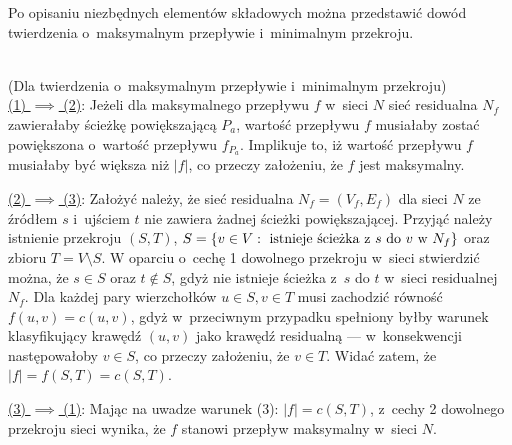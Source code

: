 \par{
  Po opisaniu niezbędnych elementów składowych można przedstawić dowód twierdzenia o~maksymalnym przepływie i~minimalnym przekroju.
\\
\\
  \begin{bproof}{(Dla twierdzenia o~maksymalnym przepływie i~minimalnym przekroju)\\}
    \underline{(1) $\implies$ (2)}: Jeżeli dla maksymalnego przepływu $f$ w~sieci $N$ sieć residualna $N_f$ zawierałaby ścieżkę powiększającą $P_a$, wartość przepływu $f$ musiałaby zostać powiększona o~wartość przepływu $f_{P_a}$.
    Implikuje to, iż wartość przepływu $f$ musiałaby być większa niż $|f|$, co przeczy założeniu, że $f$ jest maksymalny.

    \underline{(2) $\implies$ (3)}: Założyć należy, że sieć residualna $N_f=(V_f, E_f)$ dla sieci $N$ ze źródłem $s$ i~ujściem $t$ nie zawiera żadnej ścieżki powiększającej.
    Przyjąć należy istnienie przekroju $(S, T)$, $S=\{v \in V:\textnormal{ istnieje ścieżka z~}s\textnormal{ do }v\textnormal{ w~}N_f\}$ oraz zbioru $T=V\setminus S$.
    W oparciu o~cechę 1 dowolnego przekroju w~sieci stwierdzić można, że $s \in S$ oraz $t \notin S$, gdyż nie istnieje ścieżka z~$s$ do $t$ w~sieci residualnej $N_f$.
    Dla każdej pary wierzchołków $u \in S, v \in T$ musi zachodzić równość $f(u, v)=c(u, v)$, gdyż w~przeciwnym przypadku spełniony byłby warunek klasyfikujący krawędź $(u,v)$ jako krawędź residualną --- w~konsekwencji następowałoby $v \in S$, co przeczy założeniu, że $v \in T$.
    Widać zatem, że $|f|=f(S, T)=c(S, T)$.

    \underline{(3) $\implies$ (1)}: Mając na uwadze warunek (3): $|f|=c(S,T)$, z~cechy 2 dowolnego przekroju sieci wynika, że $f$ stanowi przepływ maksymalny w~sieci $N$.
  \end{bproof}
}
